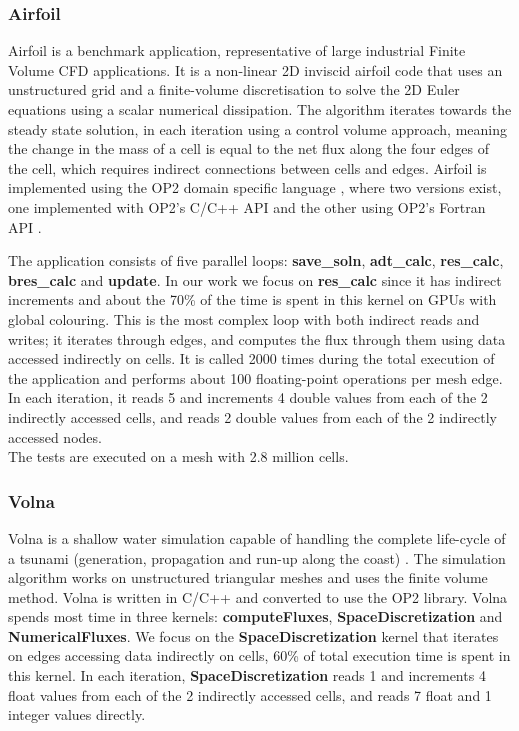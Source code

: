 \subsubsection{Airfoil}
Airfoil is a benchmark application, representative of
large industrial Finite Volume CFD applications. It is a non-linear 2D inviscid
airfoil code that uses an unstructured grid and a finite-volume discretisation
to solve the 2D Euler equations using a scalar numerical dissipation. The
algorithm iterates towards the steady state solution, in each iteration using a
control volume approach, meaning the change in the mass of a cell is equal to
the net flux along the four edges of the cell, which requires indirect
connections between cells and edges. Airfoil is implemented using the OP2 domain
specific language \cite{op2}, where two versions exist, one implemented with
OP2's C/C++ API and the other using OP2's Fortran API
\cite{giles2012op2,op2-repo}.

The application consists of five parallel loops: \textbf{save\_soln},
\textbf{adt\_calc}, \textbf{res\_calc}, \textbf{bres\_calc} and \textbf{update}.
In our work we focus on \textbf{res\_calc} since it has indirect increments and
about the 70\% of the time is spent in this kernel on GPUs with global
colouring.  This is the most complex loop with both indirect reads and writes; it
iterates through edges, and computes the flux through them using data accessed indirectly on cells. It is called 2000
times during the total execution of the application and performs about 100
floating-point operations per mesh edge. In each iteration, it reads 5 and
increments 4 double values from each of the 2 indirectly accessed cells, and
reads 2 double values from each of the 2 indirectly accessed nodes.
\\
 The tests are executed on a mesh with 2.8 million cells.

\subsubsection{Volna}
Volna is a shallow water simulation capable of handling the complete life-cycle
of a tsunami (generation, propagation and run-up along the coast)
\cite{dutykh2011volna}. The simulation algorithm works on unstructured
triangular meshes and uses the finite volume method. Volna is written in C/C++
and converted to use the OP2 library\cite{op2}. Volna spends most time in three kernels: \textbf{computeFluxes}, \textbf{SpaceDiscretization}
and \textbf{NumericalFluxes}. We focus on the \textbf{SpaceDiscretization}
kernel that iterates on edges accessing data indirectly on cells, 60\% of total execution time is spent in this kernel. In each iteration,
\textbf{SpaceDiscretization} reads 1 and increments 4 float values from each of
the 2 indirectly accessed cells, and reads 7 float and 1 integer values directly.

